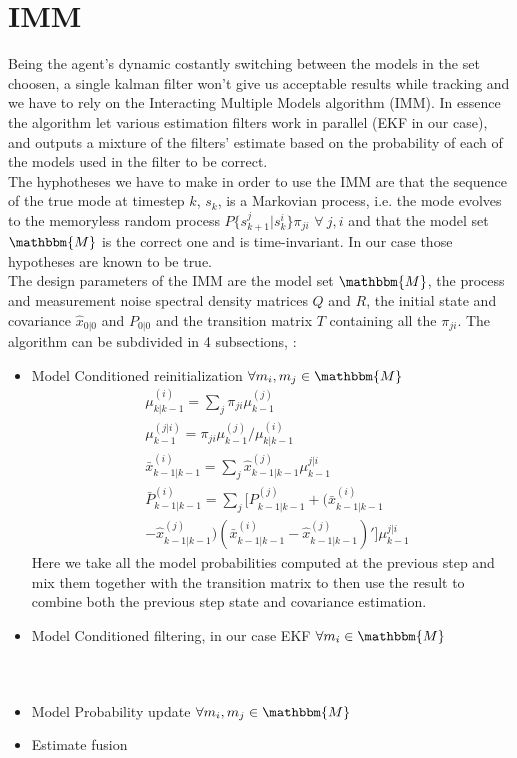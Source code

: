 \documentclass[twocolumn]{article}
\begin{document}
\section*{IMM}
Being the agent's dynamic costantly switching between the models in the set choosen, a single kalman filter won't give us acceptable results while 
tracking and we have to rely on the Interacting Multiple Models algorithm (IMM). In essence the algorithm let various estimation filters work in parallel
 (EKF in our case), and outputs a mixture of the filters' estimate based on the probability of each of the models used in the filter to be correct.
 \\
The hyphotheses we have to make in order to use the IMM are that the sequence of the true mode at timestep $k$, $s_{k}$, is a Markovian process, i.e. the mode evolves to the 
memoryless random process $P\{s_{k+1}^{j}|s_{k}^{i}\}\pi_{ji}$ $\forall\ j,i$ and that the model set $\mathbbm{M}$ is the correct one and is time-invariant.
In our case those hypotheses are known to be true.
\\
 The design parameters of the IMM are the model set $\mathbbm{M}$, the process and measurement noise spectral density matrices $Q$ and $R$, the initial 
 state and covariance $\hat{x}_{0|0}$ and $P_{0|0}$ and the transition matrix $T$ containing all the $\pi_{ji}$.
 The algorithm can be subdivided in 4 subsections, :
 \begin{itemize}
     \item Model Conditioned reinitialization $\forall m_{i},m_{j}\in \mathbbm{M}$
     \begin{align*}
                &\mu^{(i)}_{k|k-1}=\sum_{j}\pi_{ji}\mu^{(j)}_{k-1}\\
                &\mu^{(j|i)}_{k-1}=\pi_{ji}\mu^{(j)}_{k-1}/\mu^{(i)}_{k|k-1}\\
                &\bar{x}^{(i)}_{k-1|k-1}=\sum_{j}\hat{x}^{(j)}_{k-1|k-1}\mu^{j|i}_{k-1}\\
                &\bar{P}^{(i)}_{k-1|k-1}=\sum_{j}[P^{(j)}_{k-1|k-1}+(\bar{x}^{(i)}_{k-1|k-1}\\
                &-\hat{x}^{(j)}_{k-1|k-1})(\bar{x}^{(i)}_{k-1|k-1}-\hat{x}^{(j)}_{k-1|k-1})']\mu_{k-1}^{j|i}
    \end{align*}
        Here we take all the model probabilities computed at the previous step and mix them together with the 
        transition matrix to then use the result to combine both the previous step state and covariance estimation.
     \item Model Conditioned filtering, in our case EKF $\forall m_{i}\in \mathbbm{M}$
        \begin{align*}
            &\\
            &\\
            &\\
            &\\
            &\\
            &\\
        \end{align*}
     \item Model Probability update $\forall m_{i},m_{j}\in \mathbbm{M}$
     \item Estimate fusion
 \end{itemize}
\end{document}
